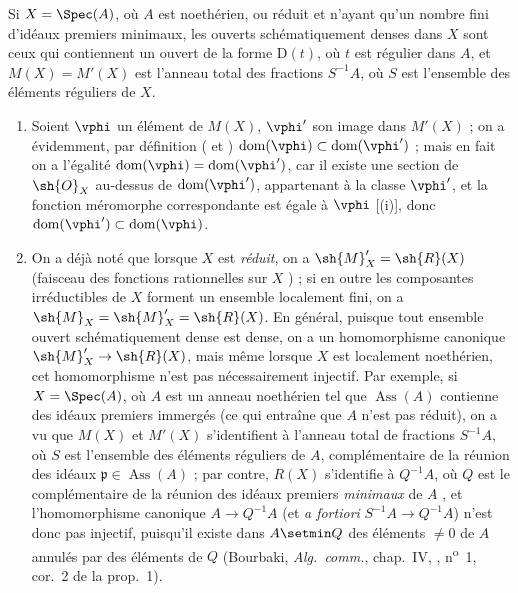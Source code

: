\begin{corollary}[20.2.12]
\label{IV.20.2.12}
Si $X=\Spec(A)$, où $A$ est noethérien, ou réduit et n'ayant qu'un nombre fini d'idéaux premiers minimaux, les ouverts schématiquement denses dans $X$ sont ceux qui contiennent un ouvert de la forme $\mathrm{D}(t)$, où $t$ est régulier dans $A$, et $M(X)=M'(X)$ est l'anneau total des fractions $S^{-1}A$, où $S$ est l'ensemble des éléments réguliers de $X$.
\end{corollary}

\begin{remarks}[20.2.13]
\begin{enumerate}[label=(\roman*)]
  \item Soient $\vphi$ un élément de $M(X)$, $\vphi'$ son image dans $M'(X)$ ; on a évidemment, par définition ( et ) $\operatorname{dom}(\vphi)\subset\operatorname{dom}(\vphi')$ ; mais en fait on a l'égalité $\operatorname{dom}(\vphi)=\operatorname{dom}(\vphi')$, car il existe une section de $\sh{O}_X$ au-dessus de $\operatorname{dom}(\vphi')$, appartenant à la classe $\vphi'$, et la fonction méromorphe correspondante est égale à $\vphi$ [(i)], donc $\operatorname{dom}(\vphi')\subset\operatorname{dom}(\vphi)$.

  \item On a déjà noté que lorsque $X$ est \emph{réduit}, on a $\sh{M}'_X=\sh{R}(X)$ (faisceau des fonctions rationnelles sur $X$ ) ; si en outre les composantes irréductibles de $X$ forment un ensemble localement fini, on a $\sh{M}_X=\sh{M}'_X=\sh{R}(X)$.
  En général, puisque tout ensemble ouvert schématiquement dense est dense, on a un homomorphisme canonique $\sh{M}'_X\to\sh{R}(X)$, mais même lorsque $X$ est localement noethérien, cet homomorphisme n'est pas nécessairement injectif.
  Par exemple, si $X=\Spec(A)$, où $A$ est un anneau noethérien tel que $\operatorname{Ass}(A)$ contienne des idéaux premiers immergés (ce qui entraîne que $A$ n'est pas réduit), on a vu que $M(X)$ et $M'(X)$ s'identifient à l'anneau total de fractions $S^{-1}A$,
  où $S$ est l'ensemble des éléments réguliers de $A$, complémentaire de la réunion des idéaux $\mathfrak{p}\in\operatorname{Ass}(A)$ ; par contre, $R(X)$ s'identifie à $Q^{-1}A$, où $Q$ est le complémentaire de la réunion des idéaux premiers \emph{minimaux} de $A$ , et l'homomorphisme canonique $A\to Q^{-1}A$ (et \emph{a fortiori} $S^{-1}A\to Q^{-1}A$) n'est donc pas injectif, puisqu'il existe dans $A\setmin Q$ des éléments $\neq0$ de $A$ annulés par des éléments de $Q$ (Bourbaki, \emph{Alg.~comm.}, chap.~IV, , n\textsuperscript{o}~1, cor.~2 de la prop.~1).


\end{enumerate}
\end{remarks}
